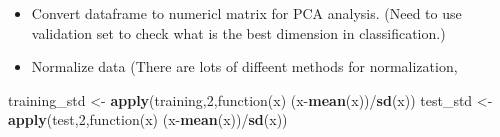 \documentclass[]{article}
\newenvironment{Shaded}{\begin{snugshade}}{\end{snugshade}}
\newcommand{\KeywordTok}[1]{\textcolor[rgb]{0.13,0.29,0.53}{\textbf{{#1}}}}
\newcommand{\DataTypeTok}[1]{\textcolor[rgb]{0.13,0.29,0.53}{{#1}}}
\newcommand{\DecValTok}[1]{\textcolor[rgb]{0.00,0.00,0.81}{{#1}}}
\newcommand{\StringTok}[1]{\textcolor[rgb]{0.31,0.60,0.02}{{#1}}}
\newcommand{\CommentTok}[1]{\textcolor[rgb]{0.56,0.35,0.01}{\textit{{#1}}}}
\newcommand{\OtherTok}[1]{\textcolor[rgb]{0.56,0.35,0.01}{{#1}}}
\newcommand{\NormalTok}[1]{{#1}}
\begin{document}
\begin{Shaded}
\end{Shaded}

\begin{itemize}
\itemsep1pt\parskip0pt
\item
  Convert dataframe to numericl matrix for PCA analysis. (Need to use
  validation set to check what is the best dimension in classification.)
\end{itemize}

\begin{Shaded}
\end{Shaded}

\begin{itemize}
\itemsep1pt\parskip0pt
\item
  Normalize data (There are lots of diffeent methods for normalization,
\end{itemize}

\begin{Shaded}
\begin{Highlighting}[]
\NormalTok{training_std <-}\StringTok{ }\KeywordTok{apply}\NormalTok{(training,}\DecValTok{2}\NormalTok{,function(x) (x-}\KeywordTok{mean}\NormalTok{(x))/}\KeywordTok{sd}\NormalTok{(x))}
\NormalTok{test_std <-}\StringTok{ }\KeywordTok{apply}\NormalTok{(test,}\DecValTok{2}\NormalTok{,function(x) (x-}\KeywordTok{mean}\NormalTok{(x))/}\KeywordTok{sd}\NormalTok{(x))}
\end{Highlighting}
\end{Shaded}
\end{document}
